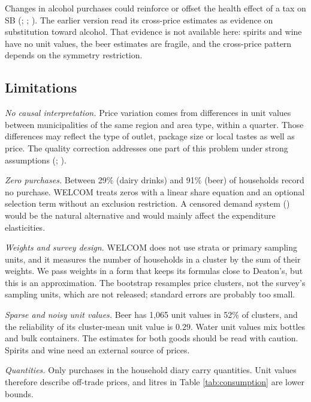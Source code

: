 \documentclass[
  11pt,
]{article}
\begin{document}
Changes in alcohol purchases could reinforce or offset the health effect
of a tax on SB (;
;
).
The earlier version read its cross-price estimates as evidence on
substitution toward alcohol. That evidence is not available here:
spirits and wine have no unit values, the beer estimates are fragile,
and the cross-price pattern depends on the symmetry restriction.

\subsection{Limitations}\label{limitations}

\emph{No causal interpretation.} Price variation comes from differences
in unit values between municipalities of the same region and area type,
within a quarter. Those differences may reflect the type of outlet,
package size or local tastes as well as price. The quality correction
addresses one part of this problem under strong assumptions
(;
).

\emph{Zero purchases.} Between 29\% (dairy drinks) and 91\% (beer) of
households record no purchase. WELCOM treats zeros with a linear share
equation and an optional selection term without an exclusion
restriction. A censored demand system
() would be the
natural alternative and would mainly affect the expenditure
elasticities.

\emph{Weights and survey design.} WELCOM does not use strata or primary
sampling units, and it measures the number of households in a cluster by
the sum of their weights. We pass weights in a form that keeps its
formulas close to Deaton's, but this is an approximation. The bootstrap
resamples price clusters, not the survey's sampling units, which are not
released; standard errors are probably too small.

\emph{Sparse and noisy unit values.} Beer has 1,065 unit values in 52\%
of clusters, and the reliability of its cluster-mean unit value is
\(0.29\). Water unit values mix bottles and bulk containers. The
estimates for both goods should be read with caution. Spirits and wine
need an external source of prices.

\emph{Quantities.} Only purchases in the household diary carry
quantities. Unit values therefore describe off-trade prices, and litres
in Table \ref{tab:consumption} are lower bounds.
\end{document}
